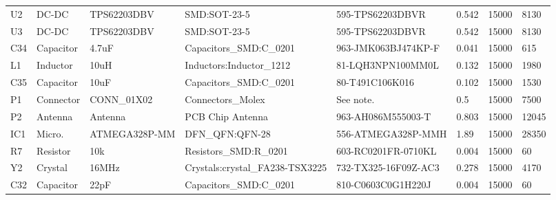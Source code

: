 \begin{landscape}
\begin{table}[]
\begin{tabular}{llllllll}
U2             & DC-DC         & TPS62203DBV                & SMD:SOT-23-5                    & 595-TPS62203DBVR                     & 0.542                & 15000           & 8130                 \\
U3             & DC-DC         & TPS62203DBV                & SMD:SOT-23-5                    & 595-TPS62203DBVR                     & 0.542                & 15000           & 8130                 \\
C34            & Capacitor     & 4.7uF                      & Capacitors\_SMD:C\_0201         & 963-JMK063BJ474KP-F                  & 0.041                & 15000           & 615                  \\
L1             & Inductor      & 10uH                       & Inductors:Inductor\_1212        & 81-LQH3NPN100MM0L                    & 0.132                & 15000           & 1980                 \\
C35            & Capacitor     & 10uF                       & Capacitors\_SMD:C\_0201         & 80-T491C106K016                      & 0.102                & 15000           & 1530                 \\
P1             & Connector     & CONN\_01X02                & Connectors\_Molex               & See note.                            & 0.5                  & 15000           & 7500                 \\
P2             & Antenna       & Antenna                    & PCB Chip Antenna                & 963-AH086M555003-T                   & 0.803                & 15000           & 12045                \\
IC1            & Micro.        & ATMEGA328P-MM              & DFN\_QFN:QFN-28                 & 556-ATMEGA328P-MMH                   & 1.89                 & 15000           & 28350                \\
R7             & Resistor      & 10k                        & Resistors\_SMD:R\_0201          & 603-RC0201FR-0710KL                  & 0.004                & 15000           & 60                   \\
Y2             & Crystal       & 16MHz                      & Crystals:crystal\_FA238-TSX3225 & 732-TX325-16F09Z-AC3                 & 0.278                & 15000           & 4170                 \\
C32            & Capacitor     & 22pF                       & Capacitors\_SMD:C\_0201         & 810-C0603C0G1H220J                   & 0.004                & 15000           & 60                   \\

\end{tabular}
\end{table}
\end{landscape}
